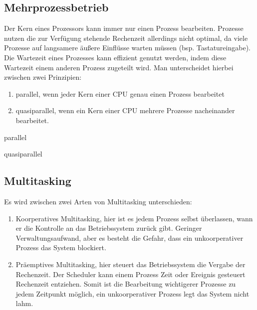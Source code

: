 \documentclass[12pt,a4paper]{article}
\begin{document}
	\subsection{Mehrprozessbetrieb}
	Der Kern eines Prozessors kann immer nur einen Prozess bearbeiten. Prozesse nutzen die zur Verfügung stehende Rechenzeit allerdings nicht optimal, da viele Prozesse auf langsamere äußere Einflüsse warten müssen (bsp. Tastatureingabe). Die Wartezeit eines Prozesses kann effizient genutzt werden, indem diese Wartezeit einem anderen Prozess zugeteilt wird. Man unterscheidet hierbei zwischen zwei Prinzipien:
	\begin{enumerate}
		\item parallel, wenn jeder Kern einer CPU genau einen Prozess bearbeitet
		\item quasiparallel, wenn ein Kern einer CPU mehrere Prozesse nacheinander bearbeitet.
	\end{enumerate}
	\begin{minipage}{.45\textwidth}
		\centering
		\newline
		parallel
	\end{minipage}
	\hspace{1cm}
	\begin{minipage}{.45\textwidth}
		\centering
		\newline
		quasiparallel
	\end{minipage}
	
	\subsection{Multitasking}
	Es wird zwischen zwei Arten von Multitasking unterschieden:
	\begin{enumerate}
		\item Koorperatives Multitasking, hier ist es jedem Prozess selbst überlassen, wann er die Kontrolle an das Betriebssystem zurück gibt. Geringer Verwaltungsaufwand, aber es besteht die Gefahr, dass ein unkoorperativer Prozess das System blockiert.
		\item Präemptives Multitasking, hier steuert das Betriebssystem die Vergabe der Rechenzeit. Der Scheduler kann einem Prozess Zeit oder Ereignis gesteuert Rechenzeit entziehen. Somit ist die Bearbeitung wichtigerer Prozesse zu jedem Zeitpunkt möglich, ein unkoorperativer Prozess legt das System nicht lahm. 
	\end{enumerate}
	
\end{document}
